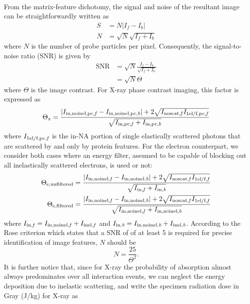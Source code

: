 \documentclass[]{article}
\newcommand\inelb{\textup{\scriptsize{inel,\textit b}}}
\newcommand\innoinelb{\textup{\scriptsize{in,noinel,\textit b}}}
\newcommand\innoinelpcb{\textup{\scriptsize{in,noinel,pc,\textit b}}}
\newcommand\inb{\textup{\scriptsize{in,\textit b}}}
\newcommand\inpcb{\textup{\scriptsize{in,pc,\textit b}}}
\newcommand\inelf{\textup{\scriptsize{inel,\textit f}}}
\newcommand\noscatf{\textup{\scriptsize{noscat,\textit f}}}
\newcommand\selff{\textup{\scriptsize{1el/f,\textit f}}}
\newcommand\innoinelf{\textup{\scriptsize{in,noinel,\textit f}}}
\newcommand\innoinelpcf{\textup{\scriptsize{in,noinel,pc,\textit f}}}
\newcommand\selfpcf{\textup{\scriptsize{1el/f,pc,\textit f}}}
\newcommand\inff{\textup{\scriptsize{in,\textit f}}}
\newcommand\inpcf{\textup{\scriptsize{in,pc,\textit f}}}
\begin{document}
\paragraph{} From the matrix-feature dichotomy, the signal and noise of the resultant image can be straightforwardly written as
\begin{align}
S &= N|I_f-I_b| \\
N &= \sqrt{N}\sqrt{I_f+I_b}
\end{align}
where $N$ is the number of probe particles per pixel. Consequently, the signal-to-noise ratio (SNR) is given by
\begin{equation}
\begin{aligned}
\mathrm{SNR} &= \sqrt{N}\frac{I_f-I_b}{\sqrt{I_f+I_b}} \\ &= \sqrt{N}\Theta
\end{aligned}
\end{equation}
where $\Theta$ is the image contrast. For X-ray phase contrast imaging, this factor is expressed as
\begin{equation}
\Theta_\mathrm{x} = \frac{|I_{\innoinelpcf}-I_{\innoinelpcb}|+2\sqrt{I_{\noscatf}I_{\selfpcf}}}{\sqrt{I_{\inpcf}+I_{\inpcb}}}
\end{equation}
where $I_{\selfpcf}$ is the in-NA portion of single elastically scattered photons that are scattered by and only by protein features. For the electron counterpart, we consider both cases where an energy filter, assumed to be capable of blocking out all inelastically scattered electrons, is used or not:
\begin{align}
\Theta_{\mathrm{e,unfiltered}} &= \frac{|I_{\innoinelf}-I_{\innoinelb}|+2\sqrt{I_{\noscatf}I_{\selff}}}{\sqrt{I_{\inff}+I_{\inb}}} \\
\Theta_{\mathrm{e,filtered}} &= \frac{|I_{\innoinelf}-I_{\innoinelb}|+2\sqrt{I_{\noscatf}I_{\selff}}}{\sqrt{I_{\innoinelf}+I_{\innoinelb}}}
\end{align}
where $I_{\inff} = I_{\innoinelf} + I_{\inelf}$ and $I_{\inb} = I_{\innoinelb} + I_{\inelb}$. According to the Rose criterion which states that a SNR of of at least 5 is required for precise identification of image features, $N$ should be
\begin{equation}
N = \frac{25}{\Theta^2}.
\end{equation}
It is further notice that, since for X-ray the probability of absorption almost always predominates over all interaction events, we can neglect the energy deposition due to inelastic scattering, and write the specimen radiation dose in Gray (J/kg) for X-ray as 
\end{document}
